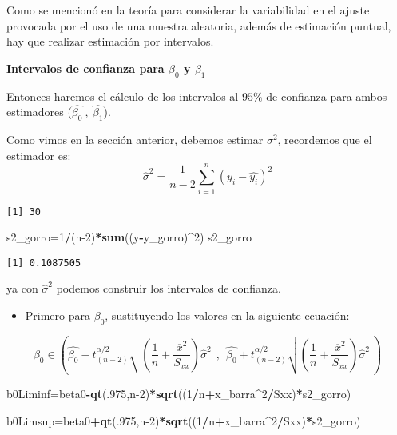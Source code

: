 \documentclass[
  a4paper,
  oneside,
  openany]{book}
\newenvironment{Shaded}{\begin{snugshade}}{\end{snugshade}}
\newcommand{\DecValTok}[1]{\textcolor[rgb]{0.00,0.00,0.81}{#1}}
\newcommand{\KeywordTok}[1]{\textcolor[rgb]{0.13,0.29,0.53}{\textbf{#1}}}
\newcommand{\NormalTok}[1]{#1}
\newcommand{\OperatorTok}[1]{\textcolor[rgb]{0.81,0.36,0.00}{\textbf{#1}}}
\providecommand{\tightlist}{%
  \setlength{\itemsep}{0pt}\setlength{\parskip}{0pt}}
\begin{document}
Como se mencionó en la teoría para considerar la variabilidad en el ajuste provocada por el uso de una muestra aleatoria, además de estimación puntual, hay que realizar estimación por intervalos.

\textbf{Intervalos de confianza para \(\beta_{0}\) y \(\beta_{1}\)}

Entonces haremos el cálculo de los intervalos al \(95\%\) de confianza para ambos estimadores (\(\hat{\beta_{0}} \ , \ \hat{\beta_{1}}\)).

Como vimos en la sección anterior, debemos estimar \(\sigma^2\), recordemos que el estimador es: \[\hat{\sigma}^2=\frac{1}{n-2}\sum_{i=1}^{n}(y_{i}-\hat{y_{i}})^2\]

\begin{verbatim}
[1] 30
\end{verbatim}

\begin{Shaded}
\begin{Highlighting}[]
\NormalTok{s2\_gorro=}\DecValTok{1}\OperatorTok{/}\NormalTok{(n}\DecValTok{{-}2}\NormalTok{)}\OperatorTok{*}\KeywordTok{sum}\NormalTok{((y}\OperatorTok{{-}}\NormalTok{y\_gorro)}\OperatorTok{\^{}}\DecValTok{2}\NormalTok{)}
\NormalTok{s2\_gorro}
\end{Highlighting}
\end{Shaded}

\begin{verbatim}
[1] 0.1087505
\end{verbatim}

ya con \(\hat{\sigma}^2\) podemos construir los intervalos de confianza.

\begin{itemize}
\tightlist
\item
  Primero para \(\beta_{0}\), sustituyendo los valores en la siguiente ecuación:
\end{itemize}

\[\beta_{0} \in \left( \hat{\beta_{0}}-t^{\alpha/2}_{(n-2)}\sqrt{\left(\frac{1}{n}+\frac{\overline{x}^2}{S_{xx}}\right)\hat{\sigma}^2} \ \ , \ \ \hat{\beta_{0}}+t^{\alpha/2}_{(n-2)}\sqrt{\left(\frac{1}{n}+\frac{\overline{x}^2}{S_{xx}}\right)\hat{\sigma}^2} \ \right)\]

\begin{Shaded}
\begin{Highlighting}[]
\NormalTok{b0Liminf=beta0}\OperatorTok{{-}}\KeywordTok{qt}\NormalTok{(.}\DecValTok{975}\NormalTok{,n}\DecValTok{{-}2}\NormalTok{)}\OperatorTok{*}\KeywordTok{sqrt}\NormalTok{((}\DecValTok{1}\OperatorTok{/}\NormalTok{n}\OperatorTok{+}\NormalTok{x\_barra}\OperatorTok{\^{}}\DecValTok{2}\OperatorTok{/}\NormalTok{Sxx)}\OperatorTok{*}\NormalTok{s2\_gorro)}

\NormalTok{b0Limsup=beta0}\OperatorTok{+}\KeywordTok{qt}\NormalTok{(.}\DecValTok{975}\NormalTok{,n}\DecValTok{{-}2}\NormalTok{)}\OperatorTok{*}\KeywordTok{sqrt}\NormalTok{((}\DecValTok{1}\OperatorTok{/}\NormalTok{n}\OperatorTok{+}\NormalTok{x\_barra}\OperatorTok{\^{}}\DecValTok{2}\OperatorTok{/}\NormalTok{Sxx)}\OperatorTok{*}\NormalTok{s2\_gorro)}
\end{Highlighting}
\end{Shaded}
\end{document}
